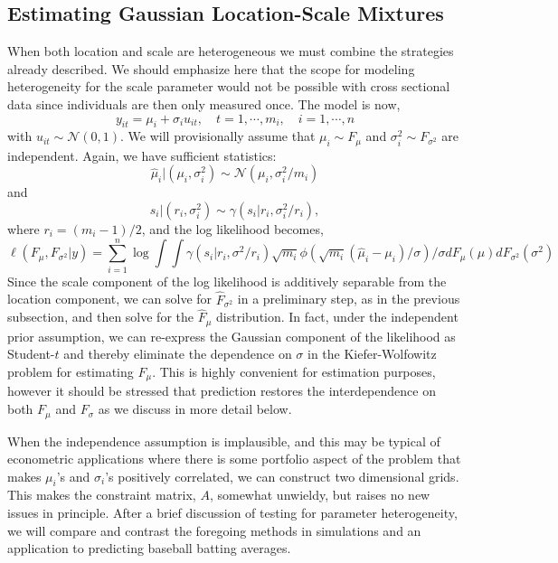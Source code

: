 \documentclass[12pt]{amsart}
\def\NN{\mathcal N}
\begin{document}
\subsection{Estimating Gaussian Location-Scale Mixtures}
When both location and scale are heterogeneous we must combine the strategies
already described.  We should emphasize here that the scope for modeling 
heterogeneity for the scale parameter would not be possible with cross 
sectional data since individuals are then  only measured once. The model is now,
\[
y_{it} = \mu_i  + \sigma_i u_{it}, \quad t = 1, \cdots , m_i, 
\quad i= 1, \cdots , n
\]
with $u_{it} \sim \NN (0,1)$.  We will provisionally assume that $\mu_i \sim F_\mu$ and
$\sigma_i^2 \sim F_{\sigma^2}$ are independent.  Again, we have sufficient
statistics:
\[
\hat \mu_i | (\mu_i , \sigma_i^2) \sim \NN (\mu_i, \sigma_i^2/m_i )
\]
and
\[
s_i | (r_i , \sigma_i^2 ) \sim \gamma ( s_i | r_i , \sigma_i^2/r_i ),
\]
where $r_i = ( m_i - 1) /2$, and the log likelihood becomes,
\[
\ell (F_\mu , F_{\sigma^2} | y) = \sum_{i=1}^n \log \int \int
\gamma(s_i | r_i , \sigma^2 /r_i ) \sqrt{m_i} 
\phi (\sqrt{m_i} (\hat \mu_i - \mu_i)/\sigma)/\sigma 
dF_\mu (\mu) dF_{\sigma^2} (\sigma^2)
\]
Since the scale component of the log likelihood is additively separable from the location
component, we can solve for $\hat F_{\sigma^2}$ in a preliminary step, as
in the previous subsection, and then solve for the $\hat F_\mu$ distribution.
In fact, under the independent prior assumption, we can  re-express the Gaussian
component of the likelihood as Student-$t$ and thereby eliminate the dependence on
$\sigma$ in the Kiefer-Wolfowitz problem for estimating $F_\mu$.   This is highly
convenient for estimation purposes, however it should be stressed that prediction
restores the interdependence on both $F_\mu$ and $F_\sigma$ as we discuss in more
detail below.

When the independence assumption is implausible, and this may be typical of econometric
applications where there is some portfolio aspect of the problem that makes $\mu_i$'s and
$\sigma_i$'s positively correlated, we can construct two dimensional grids.  This makes
the constraint matrix, $A$, somewhat unwieldy, but raises no new issues in principle.
After a brief discussion of testing for parameter heterogeneity, we will compare and
contrast the foregoing methods in simulations and an application to predicting 
baseball batting averages.
\end{document}
